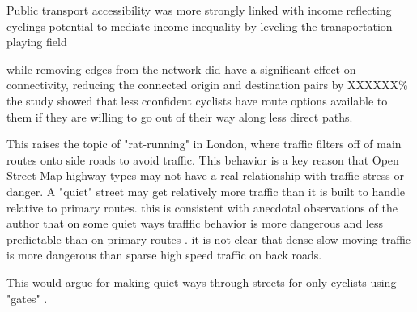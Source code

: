 Public transport accessibility was more strongly linked with income reflecting cyclings potential to mediate income inequality by leveling the transportation playing field

while removing edges from the network did have a significant effect on connectivity, reducing the connected origin and destination pairs by XXXXXX\% the study showed that less cconfident cyclists have route options available to them if they are willing to go out of their way along less direct paths. 


This raises the topic of "rat-running" in London, where traffic filters off of main routes onto side roads to avoid traffic. This behavior is a key reason that Open Street Map highway types may not have a real relationship with traffic stress or danger. A "quiet" street may get relatively more traffic than it is built to handle relative to primary routes. this is consistent with anecdotal observations of the author that on some quiet ways trafffic behavior is more dangerous and less predictable than on primary routes . it is not clear that dense slow moving traffic is more dangerous than sparse high speed traffic on back roads. 

This would argue for making quiet ways through streets for only cyclists using "gates" .